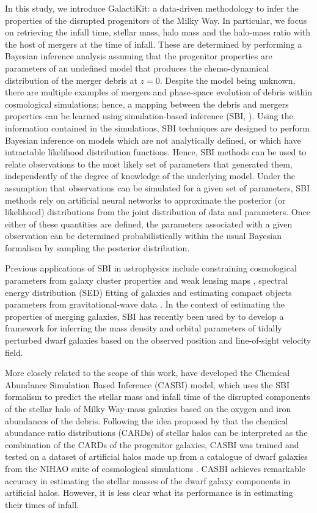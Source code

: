 In this study, we introduce GalactiKit: a data-driven methodology to infer the properties of the disrupted progenitors of the Milky Way. In particular, we focus on retrieving the infall time, stellar mass, halo mass and the halo-mass ratio with the host of mergers at the time of infall. These are determined by performing a Bayesian inference analysis assuming that the progenitor properties are parameters of an undefined model that produces the chemo-dynamical distribution of the merger debris at $z=0$. Despite the model being unknown, there are multiple examples of mergers and phase-space evolution of debris within cosmological simulations; hence, a mapping between the debris and mergers properties can be learned using simulation-based inference (SBI, \citealt{Cranmer2020}). Using the information contained in the simulations, SBI techniques are designed to perform Bayesian inference on models which are not analytically defined, or which have intractable likelihood distribution functions. Hence, SBI methods can be used to relate observations to the most likely set of parameters that generated them, independently of the degree of knowledge of the underlying model.
Under the assumption that observations can be simulated for a given set of parameters, SBI methods rely on artificial neural networks to approximate the posterior (or likelihood) distributions from the joint distribution of data and parameters. Once either of these quantities are defined, the parameters associated with a given observation can be determined probabilistically within the usual Bayesian formalism by sampling the posterior distribution. 

Previous applications of SBI in astrophysics include constraining cosmological parameters from galaxy cluster properties \citep{Hahn2023,HernandezMartinez2024} and weak lensing maps \citep{Jeffrey2021}, spectral energy distribution (SED) fitting of galaxies \citep{Hahn2022} and estimating compact objects parameters from gravitational-wave data \citep{Green2020}. In the context of estimating the properties of merging galaxies, SBI has recently been used by \cite{Widmark2025} to develop a framework for inferring the mass density and orbital parameters of tidally perturbed dwarf galaxies based on the observed position and line-of-sight velocity field. 

More closely related to the scope of this work, \cite{Viterbo2024} have developed the Chemical Abundance Simulation Based Inference (CASBI) model, which uses the SBI formalism to predict the stellar mass and infall time of the disrupted components of the stellar halo of Milky Way-mass galaxies based on the oxygen and iron abundances of the debris. Following the idea proposed by \cite{Cunningham2022} that the chemical abundance ratio distributions (CARDs) of stellar halos can be interpreted as the combination of the CARDs of the progenitor galaxies, CASBI was trained and tested on a dataset of artificial halos made up from a catalogue of dwarf galaxies from the NIHAO suite of cosmological simulations \citep{Wang2015,Buck2020}. CASBI achieves remarkable accuracy in estimating the stellar masses of the dwarf galaxy components in artificial halos. However, it is less clear what its performance is in estimating their times of infall. 


